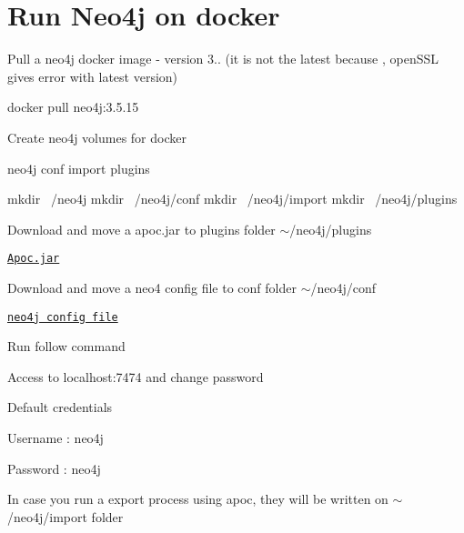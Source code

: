 \section*{Run Neo4j on docker}


\begin{DoxyEnumerate}
\item Pull a neo4j docker image -\/ version 3.. (it is not the latest because , open\+S\+SL gives error with latest version) 
\begin{DoxyCode}
docker pull neo4j:3.5.15
\end{DoxyCode}

\item Create neo4j volumes for docker 
\begin{DoxyCode}
neo4j
    conf
    import
    plugins

mkdir ~/neo4j
mkdir ~/neo4j/conf
mkdir ~/neo4j/import
mkdir ~/neo4j/plugins
\end{DoxyCode}

\item Download and move a apoc.\+jar to plugins folder $\sim$/neo4j/plugins
\end{DoxyEnumerate}
\begin{DoxyItemize}
\item \href{https://github.com/neo4j-contrib/neo4j-apoc-procedures/releases/tag/3.5.0.9}{\tt Apoc.\+jar}
\end{DoxyItemize}
\begin{DoxyEnumerate}
\item Download and move a neo4 config file to conf folder $\sim$/neo4j/conf
\end{DoxyEnumerate}
\begin{DoxyItemize}
\item \href{http://s000.tinyupload.com/index.php?file_id=06009987256241638153}{\tt neo4j config file}
\end{DoxyItemize}
\begin{DoxyEnumerate}
\item Run follow command 

\item Access to localhost\+:7474 and change password
\end{DoxyEnumerate}
\begin{DoxyItemize}
\item Default credentials
\begin{DoxyItemize}
\item Username \+: neo4j
\item Password \+: neo4j
\end{DoxyItemize}
\end{DoxyItemize}
\begin{DoxyEnumerate}
\item In case you run a export process using apoc, they will be written on $\sim$/neo4j/import folder
\end{DoxyEnumerate}

